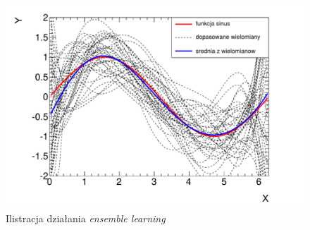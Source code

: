 \begin{figure}[ht!]
\centering
\includegraphics[scale=0.7]{res/avg1.png}
\caption[Caption for LOF]{Ilistracja działania \textit{ensemble learning}\label{avg1}}
\end{figure} 

